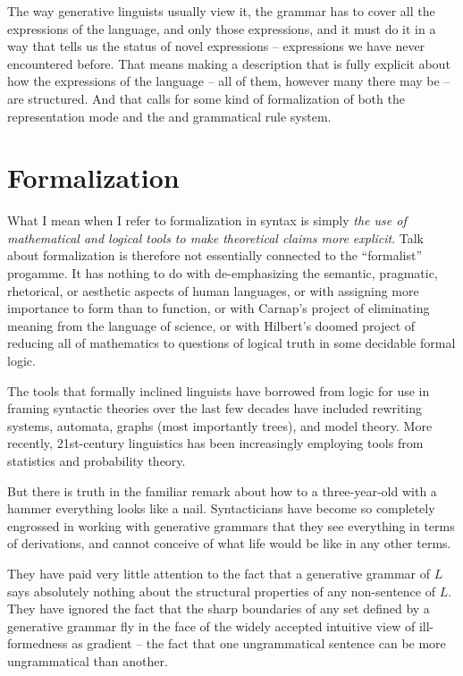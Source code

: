 \documentclass[output=paper]{langscibook}
\begin{document}
 The way generative linguists usually view it, the grammar has to cover all the expressions of the language, and only those expressions, and it must do it in a way that tells us the status of novel expressions -- expressions we have never encountered before. That means making a description that is fully explicit about how the expressions of the language -- all of them, however many there may be -- are structured. And that calls for some kind of formalization of both the representation mode and the and grammatical rule system.

\section{Formalization}
\label{sec:pullum:formalization}

What I mean when I refer to formalization in syntax is simply \emph{the use of mathematical and logical tools to make theoretical claims more explicit}. Talk about formalization is therefore not essentially connected to the ``formalist'' progamme. It has nothing to do with de-emphasizing the semantic, pragmatic, rhetorical, or aesthetic aspects of human languages, or with assigning more importance to form than to function, or with Carnap's project of eliminating meaning from the language of science, or with Hilbert's doomed project of reducing all of mathematics to questions of logical truth in some decidable formal logic.

The tools that formally inclined linguists have borrowed from logic for use in framing syntactic theories over the last few decades have included rewriting systems, automata, graphs (most importantly trees), and model theory.  More recently, 21st-century linguistics has been increasingly employing tools from statistics and probability theory.

But there is truth in the familiar remark about how to a three-year-old with a hammer everything looks like a nail.  Syntacticians have become so completely engrossed in working with generative grammars that they see everything in terms of derivations, and cannot conceive of what life would be like in any other terms.

They have paid very little attention to the fact that a generative grammar of $L$ says absolutely nothing about the structural properties of any non-sentence of $L$. They have ignored the fact that the sharp boundaries of any set defined by a generative grammar fly in the face of the widely accepted intuitive view of ill-formedness as gradient -- the fact that one ungrammatical sentence can be more ungrammatical than another.
\end{document}
